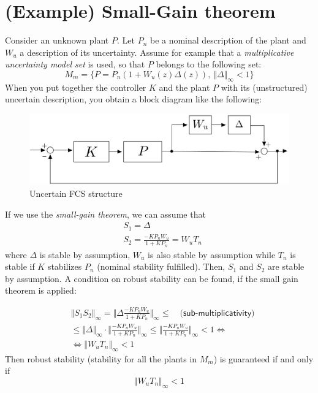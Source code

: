 \chapter{(Example) Small-Gain theorem}\label{ch: SMT_example}
Consider an unknown plant $P$. Let $P_n$ be a nominal description of the plant and $W_u$ a description of its uncertainty. Assume for example that a \textit{multiplicative uncertainty model set} is used, so that $P$ belongs to the following set:
\begin{equation}
    M_m=\{
        P=P_n(1+W_u(z)\Delta(z)), \ \Vert \Delta \Vert_\infty < 1
    \}
\end{equation}
When you put together the controller $K$ and the plant $P$ with its (unstructured) uncertain description, you obtain a block diagram like the following: 

\begin{figure}[h]
    \centering
    \includegraphics[scale=0.23]{img/uncertainFCS.jpg}
    \caption{Uncertain FCS structure}
    \label{fig:uncertainFCS}
\end{figure}

\noindent
If we use the \textit{small-gain theorem}, we can assume that
\begin{align}
    &S_1=\Delta\\
    &S_2=\frac{-KP_nW_u}{1+KP_n}= {W_u}{T_n}
\end{align}
where $\Delta$ is stable by assumption, $W_u$ is also stable by assumption while $T_n$ is stable if $K$ stabilizes $P_n$ (nominal stability fulfilled). Then, $S_1$ and $S_2$ are stable by assumption. A condition on robust stability can be found, if the small gain theorem is applied: 

\begin{align}
    &\Vert {S_1}{S_2} \Vert_\infty = 
    \bigg\Vert 
        \Delta \frac{-KP_nW_u}{1+KP_n}
    \bigg\Vert_\infty \le \quad \textsf{(sub-multiplicativity)}\\
    &\le \Vert \Delta \Vert_\infty \cdot \bigg\Vert 
    \frac{-KP_nW_u}{1+KP_n}  
\bigg\Vert_\infty \le \bigg\Vert 
\frac{-KP_nW_u}{1+KP_n}  
\bigg\Vert_\infty < 1 \iff\\
&\iff \Vert W_u T_n \Vert_\infty < 1
\end{align}
\noindent
Then robust stability (stability for all the plants in $M_m$) is guaranteed if and only if
\begin{equation}
    \Vert W_u T_n \Vert_\infty < 1
\end{equation}